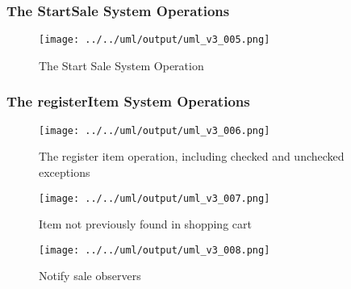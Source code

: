 \documentclass[a4paper]{scrreprt}
\begin{document}
\subsubsection*{The StartSale System Operations}
\begin{figure}[H]
    \begin{center}
        \texttt{[image: ../../uml/output/uml\_v3\_005.png]}
        \caption{The Start Sale System Operation}
        \label{fig:start-sale}
    \end{center}
\end{figure}
\subsubsection*{The registerItem System Operations}
\begin{figure}[H]
    \begin{center}
        \texttt{[image: ../../uml/output/uml\_v3\_006.png]}
        \caption{The register item operation, including checked and unchecked exceptions}
        \label{fig:reg-item}
    \end{center}
\end{figure}

\begin{figure}[H]
    \begin{center}
        \texttt{[image: ../../uml/output/uml\_v3\_007.png]}
        \caption{Item not previously found in shopping cart}
        \label{fig:item-not-in-shopping-cart}
    \end{center}
\end{figure}

\begin{figure}[H]
    \begin{center}
        \texttt{[image: ../../uml/output/uml\_v3\_008.png]}
        \caption{Notify sale observers}
        \label{fig:notify-sale-observers}
    \end{center}
\end{figure}
\end{document}
